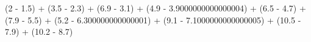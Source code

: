 \documentclass[preview]{standalone}
\begin{document}
\begin{center}
(2 - 1.5) + (3.5 - 2.3) + (6.9 - 3.1) + (4.9 - 3.9000000000000004) + (6.5 - 4.7) + (7.9 - 5.5) + (5.2 - 6.300000000000001) + (9.1 - 7.1000000000000005) + (10.5 - 7.9) + (10.2 - 8.7)
\end{center}
\end{document}
